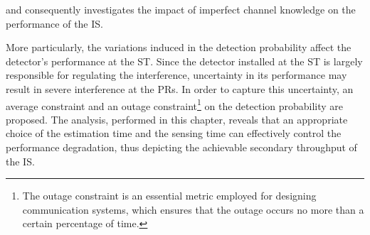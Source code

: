  and consequently investigates the impact of imperfect channel knowledge on the performance of the IS. 

More particularly, the variations induced in the detection probability affect the detector's performance at the ST. Since the detector installed at the ST is largely responsible for regulating the interference, uncertainty in its performance may result in severe interference at the PRs. In order to capture this uncertainty, an average constraint and an outage constraint\footnote{The outage constraint is an essential metric employed for designing communication systems, which ensures that the outage occurs no more than a certain percentage of time.} on the detection probability are proposed.
The analysis, performed in this chapter, reveals that an appropriate choice of the estimation time and the sensing time can effectively control the performance degradation, thus depicting the achievable secondary throughput of the IS.


